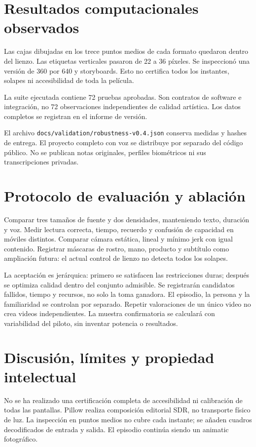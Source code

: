 \documentclass[10pt,a4paper]{article}
\begin{document}
\section{Resultados computacionales observados}
Las cajas dibujadas en los trece puntos medios de cada formato quedaron dentro del lienzo. Las etiquetas verticales pasaron de 22 a 36 píxeles. Se inspeccionó una versión de 360 por 640 y storyboards. Esto no certifica todos los instantes, solapes ni accesibilidad de toda la película.

La suite ejecutada contiene 72 pruebas aprobadas. Son contratos de software e integración, no 72 observaciones independientes de calidad artística. Los datos completos se registran en el informe de versión.

El archivo \texttt{docs/validation/robustness-v0.4.json} conserva medidas y hashes de entrega. El proyecto completo con voz se distribuye por separado del código público. No se publican notas originales, perfiles biométricos ni sus transcripciones privadas.
\section{Protocolo de evaluación y ablación}
Comparar tres tamaños de fuente y dos densidades, manteniendo texto, duración y voz. Medir lectura correcta, tiempo, recuerdo y confusión de capacidad en móviles distintos. Comparar cámara estática, lineal y mínimo jerk con igual contenido. Registrar máscaras de rostro, mano, producto y subtítulo como ampliación futura: el actual control de lienzo no detecta todos los solapes.

La aceptación es jerárquica: primero se satisfacen las restricciones duras; después se optimiza calidad dentro del conjunto admisible. Se registrarán candidatos fallidos, tiempo y recursos, no solo la toma ganadora. El episodio, la persona y la familiaridad se controlan por separado. Repetir valoraciones de un único video no crea videos independientes. La muestra confirmatoria se calculará con variabilidad del piloto, sin inventar potencia o resultados.
\section{Discusión, límites y propiedad intelectual}
No se ha realizado una certificación completa de accesibilidad ni calibración de todas las pantallas. Pillow realiza composición editorial SDR, no transporte físico de luz. La inspección en puntos medios no cubre cada instante; se añaden cuadros decodificados de entrada y salida. El episodio continúa siendo un animatic fotográfico.
\end{document}
